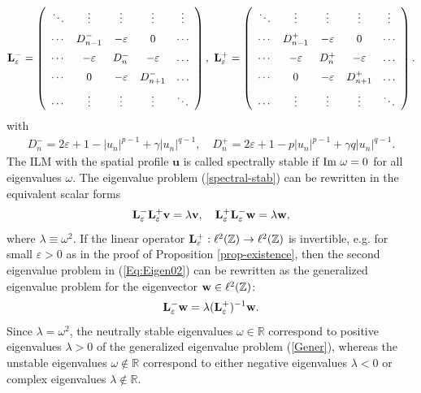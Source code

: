 \documentclass[12pt,reqno]{amsart}
\begin{document}
\begin{gather*}
{\bf L}^-_\varepsilon=\left(
\begin{array}{ccccc}
\ddots&   \vdots    &   \vdots    &    \vdots    &  \vdots    \\[2mm]
\cdots&       D^-_{n-1} &     -\varepsilon        &   0             &    \cdots\\[2mm]
\cdots&                     -\varepsilon&    D^-_{n} &               -\varepsilon&    \ldots\\[2mm]
\cdots&                       0&              -\varepsilon&D^-_{n+1} &     \ldots\\[2mm]
\cdots&    \vdots   &       \vdots&         \vdots&        \ddots
\end{array}
\right),~
{\bf L}^+_\varepsilon=\left(
\begin{array}{ccccc}
\ddots&   \vdots    &   \vdots    &    \vdots    &  \vdots    \\[2mm]
\cdots&       D^+_{n-1} &     -\varepsilon        &   0             &    \cdots\\[2mm]
\cdots&                     -\varepsilon&    D^+_{n} &               -\varepsilon&    \ldots\\[2mm]
\cdots&                       0&              -\varepsilon&D^+_{n+1} &     \ldots\\[2mm]
\cdots&    \vdots   &       \vdots&         \vdots&        \ddots
\end{array}
\right).
\end{gather*}
with
\begin{gather*}
D_n^-=2\varepsilon+1-|u_n|^{p-1}+\gamma |u_n|^{q-1},\quad D_n^+=2\varepsilon+1-p|u_n|^{p-1}+\gamma q |u_n|^{q-1}.
\end{gather*}
The ILM with the spatial profile $\mathbf{u}$ is called spectrally stable 
if ${\rm Im}~\omega=0$ for all eigenvalues $\omega$. The eigenvalue problem (\ref{spectral-stab}) can be rewritten in the equivalent scalar forms
\begin{gather}
{\bf L}^-_\varepsilon{\bf L}^+_\varepsilon{\bf v} = \lambda  {\bf v},   
\quad {\bf L}^+_\varepsilon{\bf L}^-_\varepsilon{\bf w} = \lambda  {\bf w},
\label{Eq:Eigen02}
\end{gather}
where $\lambda \equiv \omega^2$. If the linear operator ${\bf L}^+_\varepsilon : \ell^2(\mathbb{Z}) \to \ell^2(\mathbb{Z})$ is invertible, e.g. for small $\varepsilon > 0$ as in the proof of Proposition \ref{prop-existence}, 
then the second eigenvalue problem in (\ref{Eq:Eigen02}) can be rewritten 
as the generalized eigenvalue problem for the eigenvector ${\bf w} \in \ell^2(\mathbb{Z})$:
\begin{gather}
{\bf L}^-_\varepsilon{\bf w} = \lambda ({\bf L}^+_\varepsilon)^{-1} {\bf w}.
\label{Gener}
\end{gather}
Since $\lambda = \omega^2$, the neutrally stable eigenvalues $\omega \in \mathbb{R}$ correspond to positive eigenvalues $\lambda > 0$ of the generalized eigenvalue problem (\ref{Gener}), whereas the unstable eigenvalues $\omega \notin \mathbb{R}$ correspond to either negative eigenvalues $\lambda < 0$ or complex eigenvalues $\lambda \notin \mathbb{R}$. 
\end{document}
